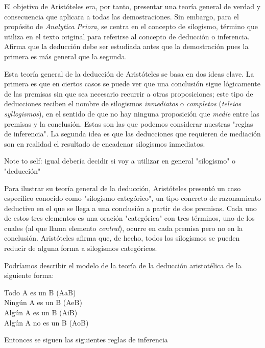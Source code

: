 \documentclass{article}
\begin{document}
El objetivo de Aristóteles era, por tanto, presentar una teoría general de verdad y consecuencia que aplicara a todas las demostraciones. Sin embargo, para el propósito de \textit{Analytica Priora}, se centra en el concepto de silogismo, término que utiliza en el texto original para referirse al concepto de deducción o inferencia\cite{ross1964aristotle}. Afirma que la deducción debe ser estudiada antes que la demostración pues la primera es más general que la segunda\cite{smith1989prior}.

Esta teoría general de la deducción de Aristóteles se basa en dos ideas clave. La primera es que en ciertos casos se puede ver que una conclusión sigue lógicamente de las premisas sin que sea necesario recurrir a otras proposiciones; este tipo de deducciones reciben el nombre de silogismos \textit{inmediatos} o \textit{completos} (\textit{teleios syllogismos}), en el sentido de que no hay ninguna proposición que \textit{medie} entre las premisas y la conclusión. Estas son las que podemos considerar nuestras "reglas de inferencia". La segunda idea es que las deducciones que requieren de mediación son en realidad el resultado de encadenar silogismos inmediatos\cite{corcoran2009aristotle}.

Note to self: igual debería decidir si voy a utilizar en general "silogismo" o "deducción"

Para ilustrar su teoría general de la deducción, Aristóteles presentó un caso específico conocido como "silogismo categórico"\cite{corcoran2009aristotle}, un tipo concreto de razonamiento deductivo en el que se llega a una conclusión a partir de dos premisas. Cada uno de estos tres elementos es una oración "categórica" con tres términos, uno de los cuales (al que llama elemento \textit{central}), ocurre en cada premisa pero no en la conclusión. Aristóteles afirma que, de hecho, todos los silogismos se pueden reducir de alguna forma a silogismos categóricos\cite{smith1989prior}.

Podríamos describir el modelo de la teoría de la deducción aristotélica de la siguiente forma:

\begin{displayquote}
Todo A es un B (AaB)\\
Ningún A es un B (AeB)\\
Algún A es un B (AiB)\\
Algún A no es un B (AoB)\\
\end{displayquote}

Entonces se siguen las siguientes reglas de inferencia
\end{document}
